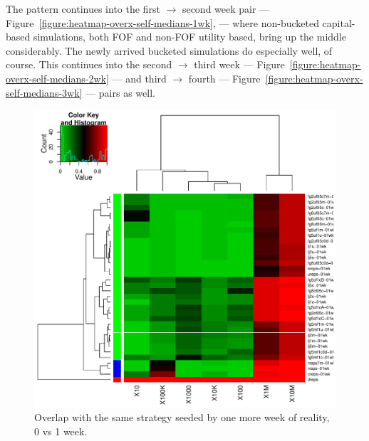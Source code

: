 \documentclass[10pt,oneside]{memoir}
\begin{document}
\begin{Spacing}{2}
The pattern continues into the first $\rightarrow$ second week pair --- Figure~\ref{figure:heatmap-overx-self-medians-1wk}, --- where non-bucketed capital-based simulations, both FOF and non-FOF utility based, bring up the middle considerably.  The newly arrived bucketed simulations do especially well, of course.  This continues into the second $\rightarrow$ third week --- Figure~\ref{figure:heatmap-overx-self-medians-2wk} --- and third $\rightarrow$ fourth --- Figure~\ref{figure:heatmap-overx-self-medians-3wk} --- pairs as well.



\begin{figure}
\begin{center}
    \includegraphics{figures/crop/heatmap-overx-self-medians-0wk}
    \caption{Overlap with the same strategy seeded by one more week of reality, 0 vs 1 week.}
    \label{figure:heatmap-overx-self-medians-0wk}
\end{center}
\end{figure}


\end{Spacing}
\end{document}
